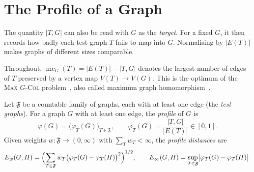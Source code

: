 
\section{The Profile of a Graph}
\label{sec:profile}

The quantity $|T,G|$ can also be read with $G$ as the \emph{target}.
For a fixed $G$, it then records how badly each test graph $T$ fails to
map into $G$.  Normalising by $|E(T)|$ makes graphs of different sizes
comparable.

Throughout, $\operatorname{mc}_G(T)=|E(T)|-|T,G|$ denotes the largest number
of edges of $T$ preserved by a vertex map $V(T)\to V(G)$.  This is the
optimum of the \textsc{Max $G$-Col} problem~\cite{fjt2009,efjt2015}, also
called maximum graph homomorphism~\cite{lrs2006}.

\begin{definition}[Profile]
\label{def:profile}
Let $\mathfrak F$ be a countable family of graphs, each with at least one
edge (the \emph{test graphs}).  For a graph $G$ with at least one edge, the
\emph{profile} of $G$ is
\[
  \varphi(G)=\bigl(\varphi_T(G)\bigr)_{T\in\mathfrak F},\qquad
  \varphi_T(G)=\frac{|T,G|}{|E(T)|}\in[0,1].
\]
Given weights $w\colon\mathfrak F\to(0,\infty)$ with
$\sum_T w_T<\infty$, the \emph{profile distances} are
\[
  E_w(G,H)=\Bigl(\sum_{T\in\mathfrak F}w_T\bigl(\varphi_T(G)-\varphi_T(H)\bigr)^2\Bigr)^{1/2},
  \qquad
  E_\infty(G,H)=\sup_{T\in\mathfrak F}\bigl|\varphi_T(G)-\varphi_T(H)\bigr|.
\]
\end{definition}

